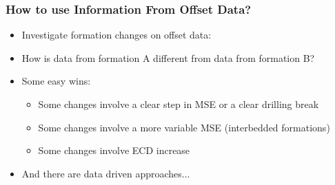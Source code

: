 \documentclass{beamer}
\begin{document}
\begin{frame} \frametitle{How to use Information From Offset Data?} 
\vspace{-1cm}

\begin{itemize}
\item<1-> Investigate formation changes on offset data:
\item<2-> How is data from formation A different from data from formation B?
\item<3-> Some easy wins:
\begin{itemize}
\item<4-> Some changes involve a clear step in MSE or a clear drilling break
\item<5-> Some changes involve a more variable MSE (interbedded formations)
\item<6-> Some changes involve ECD increase 
\end{itemize}
\item<7-> And there are data driven approaches...
\end{itemize}
\end{frame}
\end{document}
